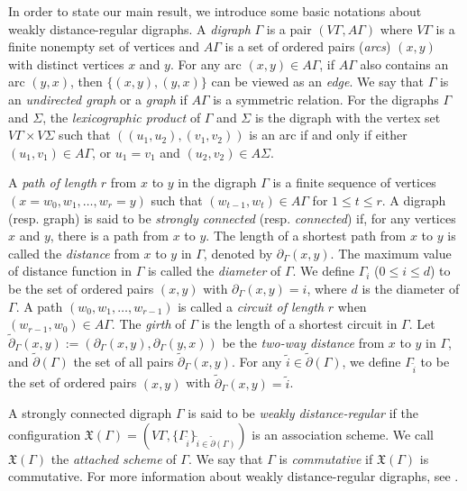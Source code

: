 \documentclass[12pt,a4paper]{amsart}
\theoremstyle{definition}
\def\wz{\tilde}
\begin{document}
In order to state our main result, we introduce some basic notations about weakly distance-regular digraphs. A \emph{digraph} $\Gamma$ is a pair $(V\Gamma, A\Gamma)$ where $V\Gamma$ is a finite nonempty set of vertices and $A\Gamma$ is a set of ordered pairs (\emph{arcs}) $(x, y)$ with distinct vertices $x$ and $y$. For any arc $(x,y)\in A\Gamma$, if $A\Gamma$ also contains an arc $(y,x)$, then $\{(x,y),(y,x)\}$ can be viewed as an {\em edge}. We say that $\Gamma$ is an \emph{undirected graph} or a {\em graph} if $A\Gamma$ is a symmetric relation. For the digraphs $\Gamma$ and $\Sigma$, the \emph{lexicographic product} of $\Gamma$ and $\Sigma$ is the digraph with the vertex set $V\Gamma\times V\Sigma$ such that $((u_1, u_2),(v_1, v_2))$ is an arc if and only if either $(u_1, v_1)\in A\Gamma$, or $u_1 = v_1$ and $(u_2, v_2)\in A\Sigma$.

A \emph{path of length} $r$ from $x$ to $y$ in the digraph $\Gamma$ is a finite sequence of vertices $(x=w_{0},w_{1},\ldots,w_{r}=y)$ such that $(w_{t-1}, w_{t})\in A\Gamma$ for $1\leq t\leq r$. A digraph (resp. graph) is said to be \emph{strongly connected} (resp. \emph{connected}) if, for any vertices $x$ and $y$, there is a path from $x$ to $y$. The length of a shortest path from $x$ to $y$ is called the \emph{distance} from $x$ to $y$ in $\Gamma$, denoted by $\partial_\Gamma(x,y)$. The maximum value of distance function in $\Gamma$ is called the \emph{diameter} of $\Gamma$. We define $\Gamma_{i}$ ($0\leq i\leq d$) to be the set of ordered pairs $(x,y)$ with $\partial_{\Gamma}(x,y)=i$, where $d$ is the diameter of $\Gamma$. A path $(w_{0},w_{1},\ldots,w_{r-1})$ is called a \emph{circuit of length} $r$ when $(w_{r-1},w_0)\in A\Gamma$. The \emph{girth} of $\Gamma$ is the length of a shortest circuit in $\Gamma$. Let $\wz{\partial}_{\Gamma}(x,y):=(\partial_{\Gamma}(x,y),\partial_{\Gamma}(y,x))$ be the \emph{two-way distance} from $x$ to $y$ in $\Gamma$, and $\wz{\partial}(\Gamma)$ the set of all pairs $\wz{\partial}_{\Gamma}(x,y)$. For any $\wz{i}\in\wz{\partial}(\Gamma)$, we define $\Gamma_{\wz{i}}$ to be the set of ordered pairs $(x,y)$ with $\wz{\partial}_{\Gamma}(x,y)=\wz{i}$.

A strongly connected digraph $\Gamma$ is said to be \emph{weakly distance-regular} if the configuration $\mathfrak{X}(\Gamma)=(V\Gamma,\{\Gamma_{\tilde{i}}\}_{\tilde{i}\in\tilde{\partial}(\Gamma)})$ is an association scheme. We call $\mathfrak{X}(\Gamma)$ the \emph{attached scheme} of $\Gamma$. We say that $\Gamma$ is \emph{commutative} if $\mathfrak{X}(\Gamma)$ is commutative. For more information about weakly distance-regular digraphs, see \cite{YF22,AM1,HS04,LS,YLS,KSW03,KSW04,YYF16,YYF18,YYF20,YYF22,YYF,QZ23,QZ24}.
\end{document}
